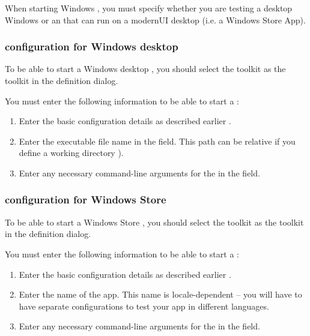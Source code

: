 
When starting Windows \gdauts{},  you must specify whether you are testing a desktop Windows \gdaut{} or an \gdaut{} that can run on a modernUI desktop (i.e. a Windows Store App). 

\subsubsection{\gdaut{} configuration for Windows desktop \gdauts{}}
To be able to start a Windows desktop \gdaut{}, you should select the  toolkit as the \gdaut{} toolkit in the \gdaut{} definition dialog. 

You must enter the following information to be able to start a  \gdaut{}:
\begin{enumerate}
\item Enter the basic configuration details as described earlier .
\item Enter the executable file name in the  field. This path can be relative if you define a working directory ).
\item Enter any necessary command-line arguments for the \gdaut{} in the
  field. 
  
\end{enumerate}

\subsubsection{\gdaut{} configuration for Windows Store \gdauts{}}
To be able to start a Windows Store \gdaut{}, you should select the  toolkit as the \gdaut{} toolkit in the \gdaut{} definition dialog. 

You must enter the following information to be able to start a  \gdaut{}:
\begin{enumerate}
\item Enter the basic configuration details as described earlier .
\item Enter the name of the app. This name is locale-dependent -- you will have to have separate \gdaut{} configurations to test your app in different languages. 
\item Enter any necessary command-line arguments for the \gdaut{} in the
  field. 
  
\end{enumerate}
